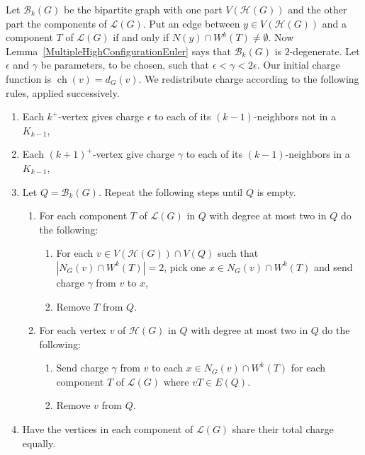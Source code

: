 \documentclass[12pt]{article}
\theoremstyle{plain}
\theoremstyle{definition}
\theoremstyle{remark}
\newcommand{\fancy}[1]{\mathcal{#1}}
\newcommand{\B}{\fancy{B}}
\renewcommand{\L}{\fancy{L}}
\newcommand{\HH}{\fancy{H}}
\newcommand{\card}[1]{\left|#1\right|}
\newcommand{\ch}{\operatorname{ch}}
\begin{document}
Let $\B_k(G)$ be the bipartite graph with one part $V(\HH(G))$ and the other part the components of $\L(G)$.  Put an edge 
between $y \in V(\HH(G))$ and a component $T$ of $\L(G)$ if and only if $N(y) \cap W^k(T) \ne \emptyset$.  Now 
Lemma~\ref{MultipleHighConfigurationEuler} says that $\B_k(G)$ is $2$-degenerate.
%
Let $\epsilon$ and $\gamma$ be parameters, to be chosen, such that $\epsilon < \gamma < 2\epsilon$. Our initial charge 
function is $\ch(v) = d_G(v)$.  We redistribute charge according to the following rules, applied successively.  
\begin{enumerate}
	\item Each $k^+$-vertex gives charge $\epsilon$ to each of its $(k-1)$-neighbors not in a $K_{k-1}$,
	\item Each $(k+1)^+$-vertex give charge $\gamma$ to each of its $(k-1)$-neighbors in a $K_{k-1}$,
	\item Let $Q = \B_k(G)$.  Repeat the following steps until $Q$ is empty.
	  \begin{enumerate}
	  	\item For each component $T$ of $\L(G)$ in $Q$ with degree at most two in $Q$ do the following:
	  	    \begin{enumerate}
	  	    	\item For each $v \in V(\HH(G)) \cap V(Q)$ such that $\card{N_G(v) \cap W^k(T)} = 2$, pick one $x \in N_G(v) \cap W^k(T)$ and send charge $\gamma$ from $v$ to $x$,
	  	    	\item Remove $T$ from $Q$.
	  	    \end{enumerate}
	  	\item For each vertex $v$ of $\HH(G)$ in $Q$ with degree at most two in $Q$ do the following:  
	  	    \begin{enumerate}
	  	        \item Send charge $\gamma$ from $v$ to each $x \in N_G(v) \cap W^k(T)$ for each component $T$ of $\L(G)$ where $vT \in E(Q)$.
	  	        \item Remove $v$ from $Q$.
	        \end{enumerate}
	  \end{enumerate}
	\item Have the vertices in each component of $\L(G)$ share their total charge equally.
\end{enumerate}
\end{document}
